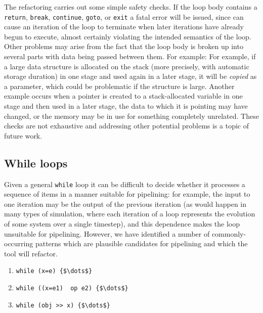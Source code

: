 The refactoring carries out some simple safety checks. If the loop
body contains a \texttt{return}, \texttt{break}, \texttt{continue},
\texttt{goto}, or \texttt{exit} a fatal error will be issued, since
can cause an iteration of the loop to terminate when later
iterations have already begun to execute, almost certainly violating the
intended semantics of the loop. Other problems may arise from the fact that the loop body is broken up
into several parts with data being passed between them. For example:
% 
  For example, if a large data structure is allocated on the stack (more precisely,
  with automatic storage duration) in one stage and used again in a
  later stage, it will be \emph{copied} as a parameter, which could be
  problematic if the structure is large.
  Another example occurs when a pointer is created to a stack-allocated variable in one stage and
  then used in a later stage, the data to which it is pointing may have
  changed, or the memory may be in use for something completely
  unrelated.
% 
These checks are not exhaustive and addressing other potential problems is a topic of future work.


\subsection{While loops}\label{while-loops}

Given a general \texttt{while} loop it can be
difficult to decide whether it processes a sequence of items in a manner
suitable for pipelining: for example, the input to one iteration may be
the output of the previous iteration (as would happen in many types of
simulation, where each iteration of a loop represents the evolution of
some system over a single timestep), and this dependence makes the loop
unsuitable for pipelining. However, we have identified a number of
commonly-occurring patterns which are plausible candidates for
pipelining and which the tool will refactor.
% 
\begin{enumerate}
\def\labelenumi{\arabic{enumi}.}
\item
  \lstinline[mathescape]|while (x=e) {$\dots$}|
\item
  \lstinline[mathescape]|while ((x=e1)  op e2) {$\dots$}|
\item
  \lstinline[mathescape]|while (obj >> x) {$\dots$}|
\end{enumerate}

